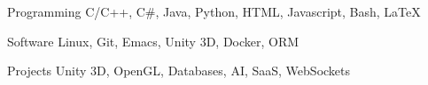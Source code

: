

\begin{cvskills}

  \cvskill
    {Programming} %
    {C/C++, C\#, Java, Python, HTML, Javascript, Bash, LaTeX}

  \cvskill
    {Software} %
    {Linux, Git, Emacs, Unity 3D, Docker, ORM} %

  \cvskill
    {Projects} %
    {Unity 3D, OpenGL, Databases, AI, SaaS, WebSockets} %


\end{cvskills}
